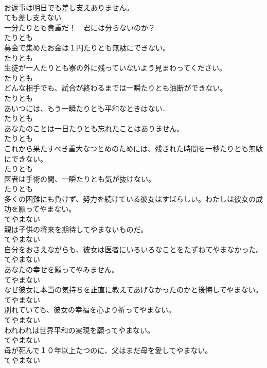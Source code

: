 \documentclass[8pt]{extreport}
\begin{document}
\begin{CJK}{UTF8}{min}
\\	お返事は明日でも差し支えありません。	
\\	ても差し支えない	
\\	一分たりとも貴重だ！　君には分らないのか？	
\\	たりとも	
\\	募金で集めたお金は１円たりとも無駄にできない。	
\\	たりとも	
\\	生徒が一人たりとも寮の外に残っていないよう見まわってください。	
\\	たりとも	
\\	どんな相手でも、試合が終わるまでは一瞬たりとも油断ができない。	
\\	たりとも	
\\	あいつには、もう一瞬たりとも平和なときはない…	
\\	たりとも	
\\	あなたのことは一日たりとも忘れたことはありません。	
\\	たりとも	
\\	これから果たすべき重大なつとめのためには、残された時間を一秒たりとも無駄にできない。	
\\	たりとも	
\\	医者は手術の間、一瞬たりとも気が抜けない。	
\\	たりとも	
\\	多くの困難にも負けず、努力を続けている彼女はすばらしい。わたしは彼女の成功を願ってやまない。	
\\	てやまない	
\\	親は子供の将来を期待してやまないものだ。	
\\	てやまない	
\\	自分をおさえながらも、彼女は医者にいろいろなことをたずねてやまなかった。	
\\	てやまない	
\\	あなたの幸せを願ってやみません。	
\\	てやまない	
\\	なぜ彼女に本当の気持ちを正直に教えてあげなかったのかと後悔してやまない。	
\\	てやまない	
\\	別れていても、彼女の幸福を心より祈ってやまない。	
\\	てやまない	
\\	われわれは世界平和の実現を願ってやまない。	
\\	てやまない	
\\	母が死んで１０年以上たつのに、父はまだ母を愛してやまない。	
\\	てやまない	

\end{CJK}
\end{document}
